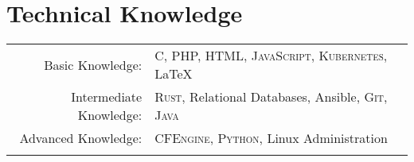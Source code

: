\documentclass[letterpaper,10pt]{article}
\begin{document}
\pagestyle{plain}
\thispagestyle{fancy}




\section{Technical Knowledge}
\begin{tabular}{rl}
	Basic Knowledge:        & \textsc{C, PHP, HTML, JavaScript, Kubernetes}, \LaTeX            \\
	Intermediate Knowledge: & \textsc{Rust}, Relational Databases, Ansible, \textsc{Git, Java} \\
	Advanced Knowledge:     & \textsc{CFEngine, Python}, Linux Administration                  \\\\
\end{tabular}


\end{document}

